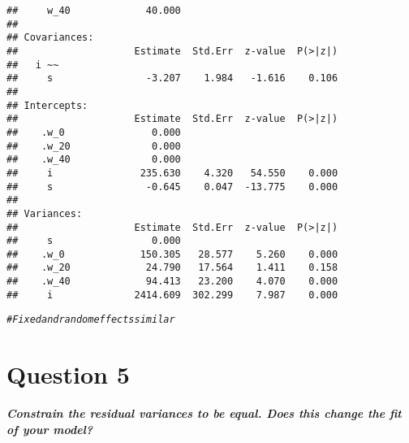 \documentclass{article}\usepackage[]{graphicx}\usepackage[]{color}
\makeatletter
\newcommand{\hlcom}[1]{\textcolor[rgb]{0.678,0.584,0.686}{\textit{#1}}}%
\newenvironment{kframe}{%
 \def\at@end@of@kframe{}%
 \ifinner\ifhmode%
  \def\at@end@of@kframe{\end{minipage}}%
  \begin{minipage}{\columnwidth}%
 \fi\fi%
 \def\FrameCommand##1{\hskip\@totalleftmargin \hskip-\fboxsep
 \colorbox{shadecolor}{##1}\hskip-\fboxsep
     \hskip-\linewidth \hskip-\@totalleftmargin \hskip\columnwidth}%
 \MakeFramed {\advance\hsize-\width
   \@totalleftmargin\z@ \linewidth\hsize
   \@setminipage}}%
 {\par\unskip\endMakeFramed%
 \at@end@of@kframe}
\newenvironment{knitrout}{}{} %
\makeatother
\begin{document}
\begin{knitrout}
\begin{kframe}
\begin{verbatim}
##     w_40             40.000                           
## 
## Covariances:
##                    Estimate  Std.Err  z-value  P(>|z|)
##   i ~~                                                
##     s                -3.207    1.984   -1.616    0.106
## 
## Intercepts:
##                    Estimate  Std.Err  z-value  P(>|z|)
##    .w_0               0.000                           
##    .w_20              0.000                           
##    .w_40              0.000                           
##     i               235.630    4.320   54.550    0.000
##     s                -0.645    0.047  -13.775    0.000
## 
## Variances:
##                    Estimate  Std.Err  z-value  P(>|z|)
##     s                 0.000                           
##    .w_0             150.305   28.577    5.260    0.000
##    .w_20             24.790   17.564    1.411    0.158
##    .w_40             94.413   23.200    4.070    0.000
##     i              2414.609  302.299    7.987    0.000
\end{verbatim}
\begin{alltt}
\hlcom{# Fixed and random effects similar}
\end{alltt}
\end{kframe}
\end{knitrout}

\section{Question 5}
\textbf{\large{\textit{
Constrain the residual variances to be equal. Does this change the fit of your model?
}}}
\end{document}
